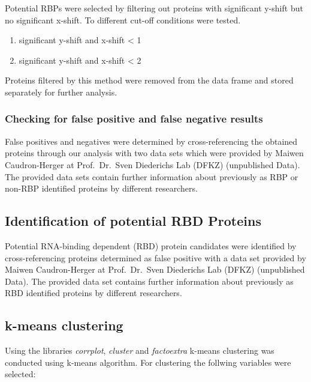 \documentclass[
]{article}
\begin{document}
Potential RBPs were selected by filtering out proteins with significant
y-shift but no significant x-shift. To different cut-off conditions were
tested.

\begin{enumerate}
\def\labelenumi{\arabic{enumi}.}
\item
  significant y-shift and x-shift \textless{} 1
\item
  significant y-shift and x-shift \textless{} 2
\end{enumerate}

Proteins filtered by this method were removed from the data frame and
stored separately for further analysis.

\hypertarget{checking-for-false-positive-and-false-negative-results}{%
\subsubsection{Checking for false positive and false negative
results}\label{checking-for-false-positive-and-false-negative-results}}

False positives and negatives were determined by cross-referencing the
obtained proteins through our analysis with two data sets which were
provided by Maiwen Caudron-Herger at Prof.~Dr.~Sven Diederichs Lab
(DFKZ) (unpublished Data). The provided data sets contain further
information about previously as RBP or non-RBP identified proteins by
different researchers.

\hypertarget{identification-of-potential-rbd-proteins}{%
\subsection{Identification of potential RBD
Proteins}\label{identification-of-potential-rbd-proteins}}

Potential RNA-binding dependent (RBD) protein candidates were identified
by cross-referencing proteins determined as false positive with a data
set provided by Maiwen Caudron-Herger at Prof.~Dr.~Sven Diederichs Lab
(DFKZ) (unpublished Data). The provided data set contains further
information about previously as RBD identified proteins by different
researchers.

\hypertarget{k-means-clustering}{%
\subsection{k-means clustering}\label{k-means-clustering}}

Using the libraries \emph{corrplot}, \emph{cluster} and
\emph{factoextra} k-means clustering was conducted using k-means
algorithm. For clustering the follwing variables were selected:
\end{document}
